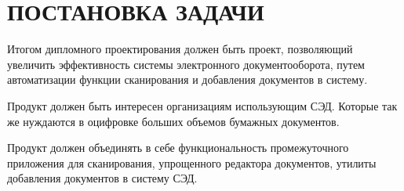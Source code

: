 \section{ПОСТАНОВКА ЗАДАЧИ}
\label{sec:problem}

Итогом дипломного проектирования должен быть проект, позволяющий увеличить эффективность системы электронного документооборота, путем автоматизации функции сканирования и добавления документов в систему.

Продукт должен быть интересен организациям использующим СЭД. Которые так же нуждаются в оцифровке больших объемов бумажных документов.

Продукт должен объединять в себе функциональность промежуточного приложения для сканирования, упрощенного редактора документов, утилиты добавления документов в систему СЭД.




